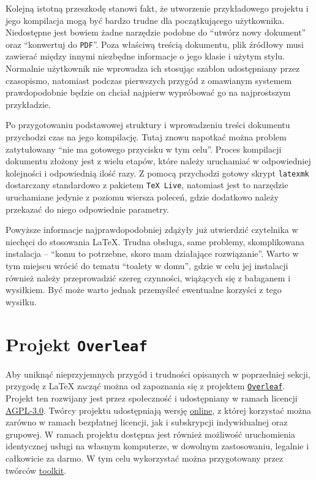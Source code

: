 Kolejną istotną przeszkodę stanowi fakt, że utworzenie przykładowego projektu i jego kompilacja mogą być bardzo trudne dla początkującego użytkownika. Niedostępne jest bowiem żadne narzędzie podobne do \enquote{utwórz nowy dokument} oraz \enquote{konwertuj do \texttt{PDF}}. Poza właściwą treścią dokumentu, plik źródłowy musi zawierać między innymi niezbędne informacje o jego klasie i użytym stylu. Normalnie użytkownik nie wprowadza ich stosując szablon udostępniany przez czasopismo, natomiast podczas pierwszych przygód z omawianym systemem prawdopodobnie będzie on chciał najpierw wypróbować go na najprostszym przykładzie.

Po przygotowaniu podstawowej struktury i wprowadzeniu treści dokumentu przychodzi czas na jego kompilację. Tutaj znowu napotkać można problem zatytułowany \enquote{nie ma gotowego przycisku w tym celu}. Proces kompilacji dokumentu złożony jest z wielu etapów, które należy uruchamiać w odpowiedniej kolejności i odpowiednią ilość razy. Z pomocą przychodzi gotowy skrypt \texttt{latexmk} dostarczany standardowo z pakietem \texttt{TeX Live}, natomiast jest to narzędzie uruchamiane jedynie z poziomu wiersza poleceń, gdzie dodatkowo należy przekazać do niego odpowiednie parametry.

Powyższe informacje najprawdopodobniej zdążyły już utwierdzić czytelnika w niechęci do stosowania \LaTeX{}. Trudna obsługa, same problemy, skomplikowana instalacja -- \enquote{komu to potrzebne, skoro mam działające rozwiązanie}. Warto w tym miejscu wrócić do tematu \enquote{toalety w domu}, gdzie w celu jej instalacji również należy przeprowadzić szereg czynności, wiążących się z bałaganem i wysiłkiem. Być może warto jednak przemyśleć ewentualne korzyści z tego wysiłku.

\section{Projekt \texttt{Overleaf}}

Aby uniknąć nieprzyjemnych przygód i trudności opisanych w poprzedniej sekcji, przygodę z \LaTeX{} zacząć można od zapoznania się z projektem \href{https://github.com/overleaf/overleaf}{\texttt{Overleaf}}. Projekt ten rozwijany jest przez społeczność i udostępniany w ramach licencji \href{https://www.gnu.org/licenses/agpl-3.0.html}{AGPL-3.0}. Twórcy projektu udostępniają wersję \href{https://www.overleaf.com}{online}, z której korzystać można zarówno w ramach bezpłatnej licencji, jak i subskrypcji indywidualnej oraz grupowej. W ramach projektu dostępna jest również możliwość uruchomienia identycznej usługi na własnym komputerze, w dowolnym zastosowaniu, legalnie i całkowicie za darmo. W tym celu wykorzystać można przygotowany przez twórców \href{https://github.com/overleaf/toolkit}{toolkit}.

